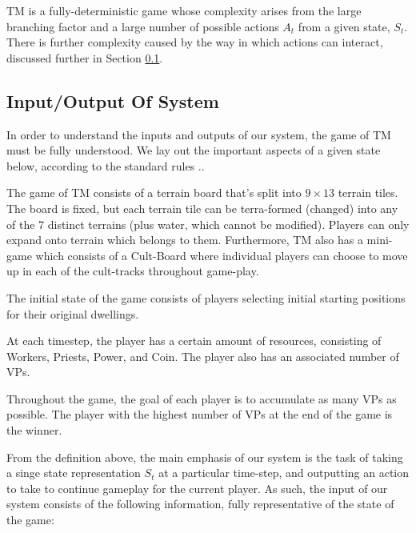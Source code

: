 \documentclass[10pt,twocolumn,letterpaper]{article}
\begin{document}
TM is a fully-deterministic game whose complexity arises from the large branching factor and a large number of possible actions $A_t$ from a given state, $S_t$. There is further complexity caused by the way in which actions can interact, discussed further in Section \ref{subsection:input/output_of_system}.

\subsection{Input/Output Of System}
\label{subsection:input/output_of_system}
In order to understand the inputs and outputs of our system, the game of TM must be fully understood. We lay out the important aspects of a given state below, according to the standard rules \cite{TMRules}..

The game of TM consists of a terrain board that's split into $9 \times 13$ terrain tiles. The board is fixed, but each terrain tile can be terra-formed (changed) into any of the 7 distinct terrains (plus water, which cannot be modified). Players can only expand onto terrain which belongs to them. Furthermore, TM also has a mini-game which consists of a Cult-Board where individual players can choose to move up in each of the cult-tracks throughout game-play. 

The initial state of the game consists of players selecting initial starting positions for their original dwellings. 

At each timestep, the player has a certain amount of resources, consisting of Workers, Priests, Power, and Coin. The player also has an associated number of VPs.

Throughout the game, the goal of each player is to accumulate as many VPs as possible. The player with the highest number of VPs at the end of the game is the winner.

From the definition above, the main emphasis of our system is the task of taking a singe state representation $S_t$ at a particular time-step, and outputting an action to take to continue gameplay for the current player. As such, the input of our system consists of the following information, fully representative of the state of the game:
\end{document}

